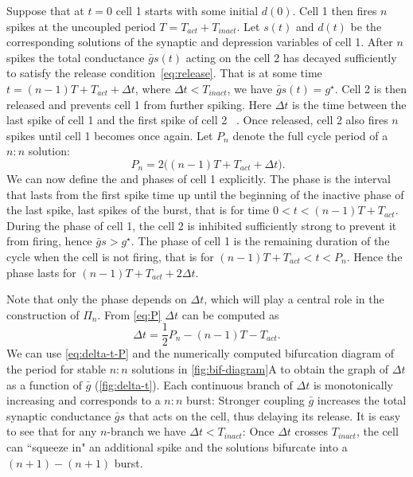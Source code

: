Suppose that at $t=0$ cell 1 starts \free{} with some initial $d(0)$. Cell 1 then fires $n$ spikes at the uncoupled period $T=T_{act}+T_{inact}$.
Let $s(t)$ and $d(t)$ be the corresponding solutions of the synaptic and depression variables of cell 1.
After $n$ spikes the total conductance $\bar g s(t)$ acting on the \suppressed{} cell 2 has decayed sufficiently to satisfy the release condition~\eqref{eq:release}.
That is at some time $t=(n-1)T + T_{act} + \Delta t$, where $\Delta t < T_{inact}$, we have $\bar g s(t)=g^{\star}$.
Cell 2 is then released and prevents cell 1 from further spiking.
Here $\Delta t$ is the time between the last spike of cell 1 and the first spike of cell 2 ~\citep{bose2011}.
Once released, cell 2 also fires $n$ spikes until cell 1 becomes \free{} once again.
Let $P_n$ denote the full cycle period of a $n:n$ solution:
\begin{equation}
	~\label{eq:P}
	P_n = 2\Big( (n-1)T + T_{act} + \Delta t \Big).
\end{equation}
We can now define the \free{} and \suppressed{} phases of cell 1 explicitly.
The \free{} phase is the interval that lasts from the first spike time up until the beginning of the inactive phase of the last spike, last spikes of the burst, that is for time $0<t<(n-1)T + T_{act}$.
During the \free{} phase of cell 1, the \suppressed{} cell 2 is inhibited sufficiently strong to prevent it from firing, hence $\bar g s > g^{\star}$.
The \suppressed{} phase of cell 1 is the remaining duration of the cycle when the cell is not firing, that is for $(n-1)T + T_{act} < t < P_n$.
Hence the \suppressed{} phase lasts for $(n-1)T + T_{act} + 2\Delta t$.

Note that only the \suppressed{} phase depends on $\Delta t$, which will play a central role in the construction of $\Pi_n$.
From \cref{eq:P} $\Delta t$ can be computed as
\begin{equation}
	\label{eq:delta-t-P}
	\Delta t = \frac{1}{2}P_n - (n-1)T - T_{act}.
\end{equation}
We can use \cref{eq:delta-t-P} and the numerically computed bifurcation diagram of the period for stable $n:n$ solutions in \cref{fig:bif-diagram}A to obtain the graph of $\Delta t$ as a function of $\bar g$ (\cref{fig:delta-t}).
Each continuous branch of $\Delta t$ is monotonically increasing and corresponds to a $n:n$ burst:
Stronger coupling $\bar g$ increases the total synaptic conductance $\bar g s$ that acts on the \suppressed{} cell, thus delaying its release.
It is easy to see that for any $n$-branch we have $\Delta t < T_{inact}$:
Once $\Delta t$ crosses $T_{inact}$, the \free{} cell can ``squeeze in" an additional spike and the solutions bifurcate into a $(n+1)-(n+1)$ burst.

